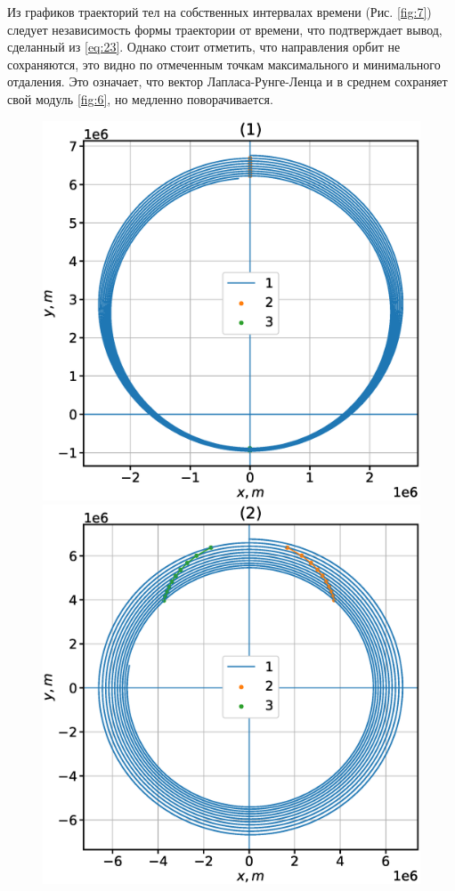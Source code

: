 \documentclass[12pt]{article}
\begin{document}
Из графиков траекторий тел на собственных интервалах времени (Рис. \ref{fig:7}) следует независимость формы траектории от времени, что подтверждает
вывод, сделанный из \ref{eq:23}. Однако стоит отметить, что направления орбит не сохраняются, это видно по отмеченным точкам максимального и минимального
отдаления. Это означает, что вектор Лапласа-Рунге-Ленца и в среднем сохраняет свой модуль \ref{fig:6}, но медленно поворачивается.
\begin{figure}[H]
      \includegraphics[width=1.0\linewidth]{y_x_1.eps}
    \endminipage\hfill
      \includegraphics[width=1.0\linewidth]{y_x_2.eps}

\end{figure}
\end{document}
